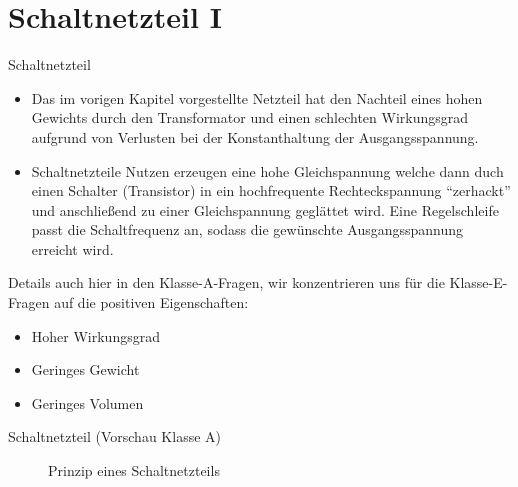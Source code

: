 
\section{Schaltnetzteil I}
\label{section:schaltnetzteil_1}
\begin{frame}{Schaltnetzteil}
    \begin{itemize}
        \item Das im vorigen Kapitel vorgestellte Netzteil hat den Nachteil eines
        hohen Gewichts durch den Transformator und einen schlechten Wirkungsgrad
        aufgrund von Verlusten bei der Konstanthaltung der Ausgangsspannung.
        \item Schaltnetzteile Nutzen erzeugen eine hohe Gleichspannung welche
        dann duch einen Schalter (Transistor) in ein hochfrequente
        Rechteckspannung \enquote{zerhackt} und anschließend zu einer
        Gleichspannung geglättet wird. Eine Regelschleife passt die
        Schaltfrequenz an, sodass die gewünschte Ausgangsspannung erreicht
        wird.
    \end{itemize}
    \pause
    Details auch hier in den Klasse-A-Fragen, wir konzentrieren uns
    für die Klasse-E-Fragen auf die positiven Eigenschaften:
    \begin{itemize}
        \item Hoher Wirkungsgrad
        \item Geringes Gewicht
        \item Geringes Volumen
    \end{itemize}
\end{frame}

\begin{frame}{Schaltnetzteil (Vorschau Klasse A)}
    \begin{center}
        \begin{figure}
            \caption{Prinzip eines Schaltnetzteils}
        \end{figure}
    \end{center}
\end{frame}

\begin{frame}
\end{frame}

